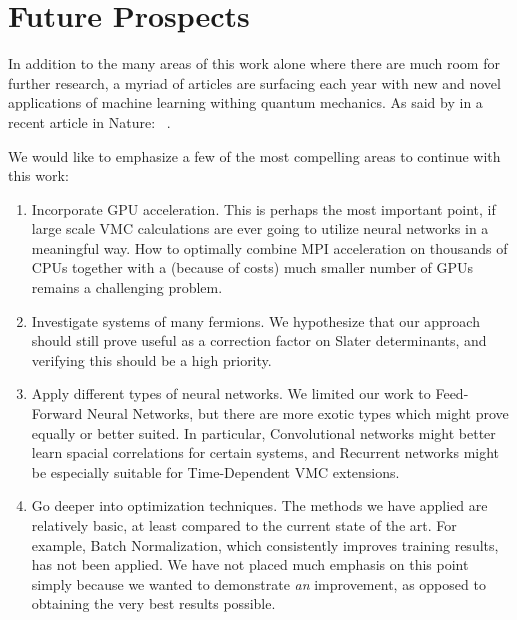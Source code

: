\documentclass[Thesis.tex]{subfiles}
\begin{document}
\section{Future Prospects}

In addition to the many areas of this work alone where there are much room for
further research, a myriad of articles are surfacing each year with new and
novel applications of machine learning withing quantum mechanics. As said by
\citeauthor{Melko-2019} in a recent article in Nature: ~\cite{Melko-2019}.

We would like to emphasize a few of the most compelling areas to continue with
this work:

\begin{enumerate}
\item Incorporate GPU acceleration. This is perhaps the most important point, if
  large scale VMC calculations are ever going to utilize neural networks in a
  meaningful way. How to optimally combine MPI acceleration on thousands of CPUs
  together with a (because of costs) much smaller number of GPUs remains a
  challenging problem.
\item Investigate systems of many fermions. We hypothesize that our approach
  should still prove useful as a correction factor on Slater determinants, and
  verifying this should be a high priority.
\item Apply different types of neural networks. We limited our work to
  Feed-Forward Neural Networks, but there are more exotic types which might
  prove equally or better suited. In particular, Convolutional networks might
  better learn spacial correlations for certain systems, and Recurrent networks
  might be especially suitable for Time-Dependent VMC extensions.
\item Go deeper into optimization techniques. The methods we have applied are
  relatively basic, at least compared to the current state of the art. For example,
  Batch Normalization, which consistently improves training results, has not
  been applied. We have not placed much emphasis on this point simply because we
  wanted to demonstrate \emph{an} improvement, as opposed to obtaining the very
  best results possible.
\end{enumerate}
\end{document}
